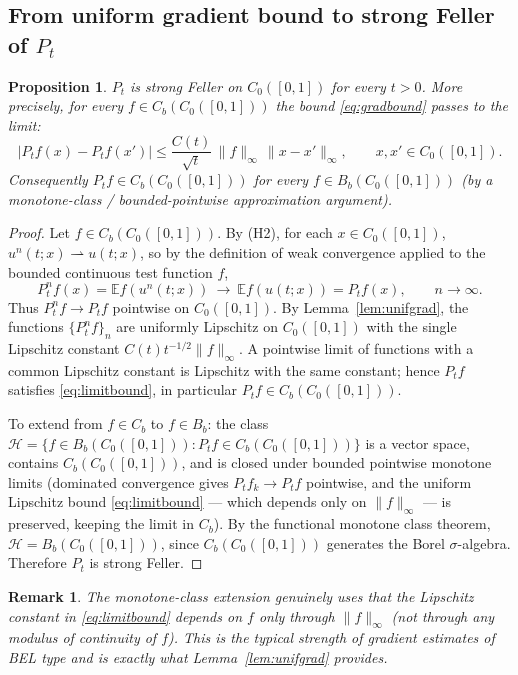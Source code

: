 \documentclass[11pt]{article}
\newtheorem{proposition}{Proposition}
\newtheorem{remark}{Remark}
\newcommand{\E}{\mathbb{E}}
\newcommand{\C}{C_0([0,1])}
\begin{document}
\subsection{From uniform gradient bound to strong Feller of $P_t$}

\begin{proposition}\label{prop:sf}
$P_t$ is strong Feller on $\C$ for every $t>0$. More precisely, for every
$f\in C_b(\C)$ the bound \eqref{eq:gradbound} passes to the limit:
\begin{equation}\label{eq:limitbound}
|P_tf(x)-P_tf(x')|\le \frac{C(t)}{\sqrt t}\,\|f\|_\infty\,\|x-x'\|_\infty,
\qquad x,x'\in\C .
\end{equation}
Consequently $P_tf\in C_b(\C)$ for every $f\in B_b(\C)$ (by a monotone-class /
bounded-pointwise approximation argument).
\end{proposition}

\begin{proof}
Let $f\in C_b(\C)$. By (H2), for each $x\in\C$, $u^n(t;x)\rightharpoonup
u(t;x)$, so by the definition of weak convergence applied to the bounded
continuous test function $f$,
\[
P^n_tf(x)=\E f(u^n(t;x))\ \longrightarrow\ \E f(u(t;x))=P_tf(x),
\qquad n\to\infty .
\]
Thus $P^n_tf\to P_tf$ pointwise on $\C$. By Lemma~\ref{lem:unifgrad}, the
functions $\{P^n_tf\}_n$ are uniformly Lipschitz on $\C$ with the single Lipschitz
constant $C(t)t^{-1/2}\|f\|_\infty$. A pointwise limit of functions with a common
Lipschitz constant is Lipschitz with the same constant; hence $P_tf$ satisfies
\eqref{eq:limitbound}, in particular $P_tf\in C_b(\C)$.

To extend from $f\in C_b$ to $f\in B_b$: the class
$\mathcal H=\{f\in B_b(\C): P_tf\in C_b(\C)\}$ is a vector space, contains
$C_b(\C)$, and is closed under bounded pointwise monotone limits (dominated
convergence gives $P_tf_k\to P_tf$ pointwise, and the uniform Lipschitz bound
\eqref{eq:limitbound} — which depends only on $\|f\|_\infty$ — is preserved,
keeping the limit in $C_b$). By the functional monotone class theorem,
$\mathcal H=B_b(\C)$, since $C_b(\C)$ generates the Borel $\sigma$-algebra.
Therefore $P_t$ is strong Feller.
\end{proof}

\begin{remark}
The monotone-class extension genuinely uses that the Lipschitz constant in
\eqref{eq:limitbound} depends on $f$ only through $\|f\|_\infty$ (not through any
modulus of continuity of $f$). This is the typical strength of gradient
estimates of BEL type and is exactly what Lemma~\ref{lem:unifgrad} provides.
\end{remark}
\end{document}
